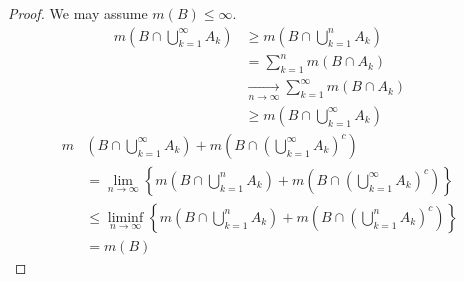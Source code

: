 \begin{proof}
	We may assume $m(B) \leq \infty$. 
	\begin{align*}
	  m \left(B \cap \bigcup_{k = 1}^{\infty} A_k \right) & \geq m \left(B \cap \bigcup_{k = 1}^{n} A_k \right) \\
		& = \sum_{k = 1}^{n} m(B \cap A_k) \tag{Step 3$'$} \\
		& \xrightarrow[n \to \infty]{} \sum_{k = 1}^{\infty} m(B \cap A_k) \\
		& \geq m \left( B \cap \bigcup_{k = 1}^{\infty} A_k \right)
	\end{align*}
	\begin{align*}
	  m & \left(B \cap \bigcup_{k = 1}^{\infty} A_k \right) + m \left(B \cap \left( \bigcup_{k = 1}^{\infty} A_k\right)^{c}\right) \\
		& = \lim_{n \to \infty} \left\{ m \left( B \cap \bigcup_{k = 1}^{n} A_k \right) + m \left(B \cap \left(\bigcup_{k = 1}^{\infty} A_k\right)^{c}\right)\right\} \\
		& \leq \liminf_{n \to \infty} \left\{ m \left(B \cap \bigcup_{k = 1}^{n} A_k\right) + m \left(B \cap \left(\bigcup_{k = 1}^{n} A_k\right)^{c}\right)\right\} \\
		& = m(B)
	\end{align*}
\end{proof}
